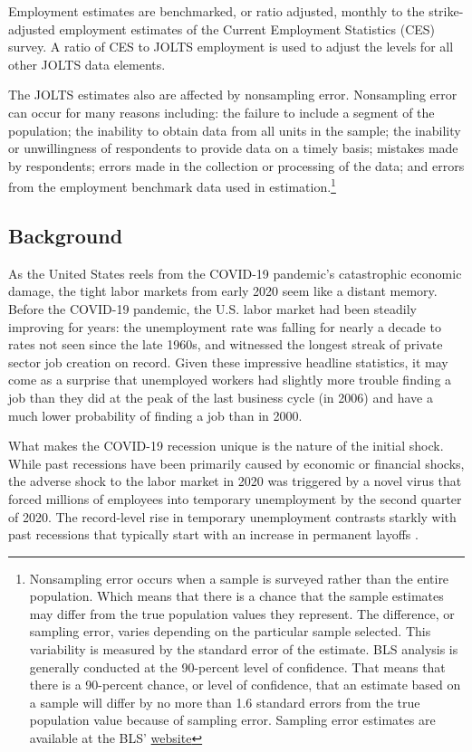 \documentclass[
  11pt,
]{article}
\begin{document}
Employment estimates are benchmarked, or ratio adjusted, monthly to the
strike-adjusted employment estimates of the Current Employment
Statistics (CES) survey. A ratio of CES to JOLTS employment is used to
adjust the levels for all other JOLTS data elements.

The JOLTS estimates also are affected by nonsampling error. Nonsampling
error can occur for many reasons including: the failure to include a
segment of the population; the inability to obtain data from all units
in the sample; the inability or unwillingness of respondents to provide
data on a timely basis; mistakes made by respondents; errors made in the
collection or processing of the data; and errors from the employment
benchmark data used in estimation.\footnote{Nonsampling error occurs
  when a sample is surveyed rather than the entire population. Which
  means that there is a chance that the sample estimates may differ from
  the true population values they represent. The difference, or sampling
  error, varies depending on the particular sample selected. This
  variability is measured by the standard error of the estimate. BLS
  analysis is generally conducted at the 90-percent level of confidence.
  That means that there is a 90-percent chance, or level of confidence,
  that an estimate based on a sample will differ by no more than 1.6
  standard errors from the true population value because of sampling
  error. Sampling error estimates are available at the BLS'
  \href{https://www.bls.gov/jlt/jolts_median_standard_errors.htm}{website}}

\hypertarget{background}{%
\subsection{Background}\label{background}}

As the United States reels from the COVID-19 pandemic's catastrophic
economic damage, the tight labor markets from early 2020 seem like a
distant memory. Before the COVID-19 pandemic, the U.S. labor market had
been steadily improving for years: the unemployment rate was falling for
nearly a decade to rates not seen since the late 1960s, and witnessed
the longest streak of private sector job creation on record. Given these
impressive headline statistics, it may come as a surprise that
unemployed workers had slightly more trouble finding a job than they did
at the peak of the last business cycle (in 2006) and have a much lower
probability of finding a job than in 2000.

What makes the COVID-19 recession unique is the nature of the initial
shock. While past recessions have been primarily caused by economic or
financial shocks, the adverse shock to the labor market in 2020 was
triggered by a novel virus that forced millions of employees into
temporary unemployment by the second quarter of 2020. The record-level
rise in temporary unemployment contrasts starkly with past recessions
that typically start with an increase in permanent layoffs
\citep{elsby10}.
\end{document}
